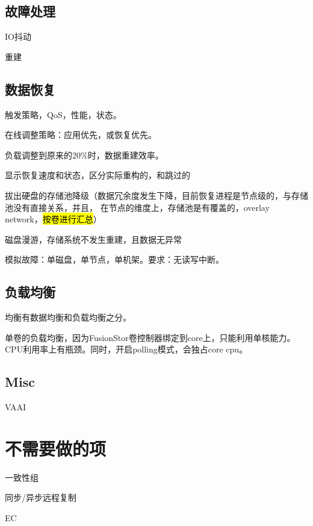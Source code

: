 \subsection{故障处理}

\begin{enumbox}
    \item IO抖动
    \item 重建
\end{enumbox}

\subsection{数据恢复}

触发策略，QoS，性能，状态。

\begin{enumbox}
    \item 在线调整策略：应用优先，或恢复优先。
    \item 负载调整到原来的20\%时，数据重建效率。
    \item 显示恢复速度和状态，区分实际重构的，和跳过的
    \item 拔出硬盘的存储池降级（数据冗余度发生下降，目前恢复进程是节点级的，与存储池没有直接关系，并且，
        在节点的维度上，存储池是有覆盖的，overlay network，\hl{按卷进行汇总}）
    \item 磁盘漫游，存储系统不发生重建，且数据无异常
    \item 模拟故障：单磁盘，单节点，单机架。要求：无读写中断。
\end{enumbox}

\subsection{负载均衡}

均衡有数据均衡和负载均衡之分。

单卷的负载均衡，因为FusionStor卷控制器绑定到core上，只能利用单核能力。
CPU利用率上有瓶颈。同时，开启polling模式，会独占core cpu。

\subsection{Misc}

VAAI

\section{不需要做的项}

\begin{enumbox}
    \item 一致性组
    \item 同步/异步远程复制
    \item EC
\end{enumbox}
